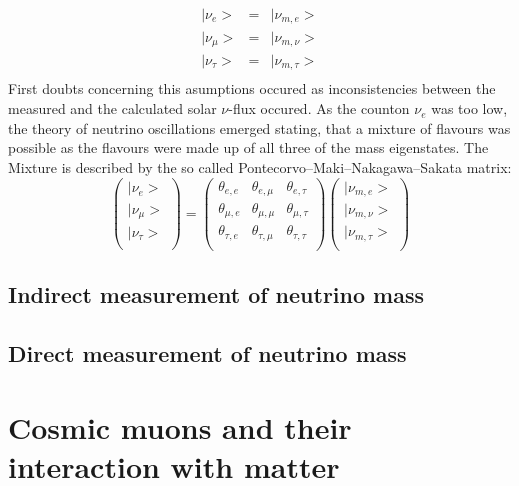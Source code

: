     \begin{equation}
	\begin{array}{ccc}
      	|\nu_e>		& = & |\nu_{m,e}>\\
      	|\nu_\mu>	& = & |\nu_{m,\nu}>\\
      	|\nu_\tau>	& = & |\nu_{m,\tau}>\\
    	 \end{array}
    \end{equation}
    First doubts concerning this asumptions occured as inconsistencies between the measured and the calculated solar $\nu$-flux occured. As the counton $\nu_e$ was too low, the theory of neutrino oscillations emerged stating, that a mixture of flavours was possible as the flavours were made up of all three of the mass eigenstates. The Mixture is described by the so called Pontecorvo–Maki–Nakagawa–Sakata matrix:
        \begin{equation}
        \left(
        \begin{array}{c}
	  |\nu_e>\\
	  |\nu_\mu>\\
	  |\nu_\tau>\\
        \end{array}
        \right)
	 = \left(
	\begin{array}{ccc}
      	\theta_{e,e} & \theta_{e,\mu} & \theta_{e,\tau}\\
      	\theta_{\mu,e} & \theta_{\mu,\mu} & \theta_{\mu,\tau}\\
      	\theta_{\tau,e} & \theta_{\tau,\mu} & \theta_{\tau,\tau}\\
      	\end{array}
	\right)
	\left(
	\begin{array}{c}
      	|\nu_{m,e}>\\
      	|\nu_{m,\nu}>\\
      	|\nu_{m,\tau}>\\
    	 \end{array}
    	 \right)
    \end{equation}
    
     
    \subsection{Indirect measurement of neutrino mass}
    \label{ch:Introduction:sec:Massive neutrino:subsec:Measuring Neutrino Mass}

    \subsection{Direct measurement of neutrino mass}
    \label{ch:Introduction:sec:Massive neutrino:subsec:Measuring Neutrino Mass}
      
    \section{Cosmic muons and their interaction with matter}
    \label{ch:introduction:sec:Cosmic Air Showers}


